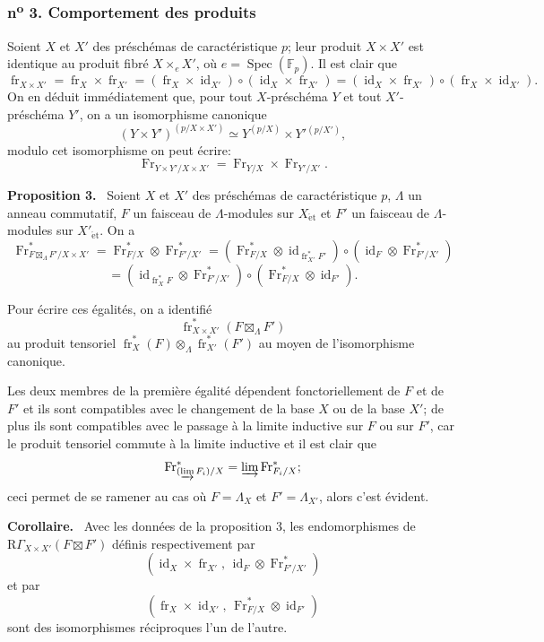 \documentclass[11pt]{article}
\newenvironment{statement}[1]{\par\medskip\noindent\textbf{#1.}\ }{\par\medskip}
\DeclareMathOperator{\Spec}{Spec}
\providecommand{\et}{\mathrm{\acute{e}t}}
\providecommand{\RGamma}{\mathrm R\Gamma}
\providecommand{\id}{\operatorname{id}}
\providecommand{\id}{\operatorname{id}}
\providecommand{\id}{\operatorname{id}}
\providecommand{\RGamma}{\mathrm R\Gamma}
\providecommand{\id}{\operatorname{id}}
\providecommand{\Spec}{\operatorname{Spec}}
\providecommand{\Spec}{\operatorname{Spec}}
\providecommand{\id}{\operatorname{id}}
\providecommand{\Spec}{\operatorname{Spec}}
\providecommand{\fr}{\operatorname{fr}}
\providecommand{\Fr}{\operatorname{Fr}}
\providecommand{\Fr}{\operatorname{Fr}}
\providecommand{\fr}{\operatorname{fr}}
\providecommand{\Spec}{\operatorname{Spec}}
\providecommand{\id}{\operatorname{id}}
\providecommand{\RGamma}{\mathrm R\Gamma}
\providecommand{\et}{\acute{e}t}
\providecommand{\boxt}{\boxtimes}
\begin{document}
\subsubsection*{n\textsuperscript{o} 3. Comportement des produits}

Soient $X$ et $X'$ des préschémas de caractéristique $p$; leur produit $X\times X'$ est identique au produit fibré $X\times_eX'$, où $e=\Spec(\mathbb F_p)$. Il est clair que
\[
\fr_{X\times X'}=\fr_X\times\fr_{X'}=(\fr_X\times\id_{X'})\circ(\id_X\times\fr_{X'})
=(\id_X\times\fr_{X'})\circ(\fr_X\times\id_{X'}).
\]
On en déduit immédiatement que, pour tout $X$-préschéma $Y$ et tout $X'$-préschéma $Y'$, on a un isomorphisme canonique
\[
(Y\times Y')^{(p/X\times X')}\simeq Y^{(p/X)}\times Y'{}^{(p/X')},
\]
modulo cet isomorphisme on peut écrire:
\[
\Fr_{Y\times Y'/X\times X'}=\Fr_{Y/X}\times\Fr_{Y'/X'}.
\]

\begin{statement}{Proposition 3}
Soient $X$ et $X'$ des préschémas de caractéristique $p$, $\Lambda$ un anneau commutatif, $F$ un faisceau de $\Lambda$-modules sur $X_{\et}$ et $F'$ un faisceau de $\Lambda$-modules sur $X'_{\et}$. On a
\[
\Fr^*_{F\boxt_\Lambda F'/X\times X'}
=\Fr^*_{F/X}\otimes\Fr^*_{F'/X'}
=(\Fr^*_{F/X}\otimes\id_{\fr_{X'}^*F'})\circ
(\id_F\otimes\Fr^*_{F'/X'})
\]
\[
=(\id_{\fr_X^*F}\otimes\Fr^*_{F'/X'})\circ
(\Fr^*_{F/X}\otimes\id_{F'}).
\]
\end{statement}

Pour écrire ces égalités, on a identifié
\[
\fr_{X\times X'}^*(F\boxt_\Lambda F')
\]
au produit tensoriel $\fr_X^*(F)\otimes_\Lambda\fr_{X'}^*(F')$ au moyen de l'isomorphisme canonique.

Les deux membres de la première égalité dépendent fonctoriellement de $F$ et de $F'$ et ils sont compatibles avec le changement de la base $X$ ou de la base $X'$; de plus ils sont compatibles avec le passage à la limite inductive sur $F$ ou sur $F'$, car le produit tensoriel commute à la limite inductive et il est clair que
\[
\Fr^*_{(\varinjlim F_i)/X}=\varinjlim\Fr^*_{F_i/X};
\]
ceci permet de se ramener au cas où $F=\Lambda_X$ et $F'=\Lambda_{X'}$, alors c'est évident.

\begin{statement}{Corollaire}
Avec les données de la proposition 3, les endomorphismes de $\RGamma_{X\times X'}(F\boxt F')$ définis respectivement par
\[
(\id_X\times\fr_{X'},\,\id_F\otimes\Fr^*_{F'/X'})
\]
et par
\[
(\fr_X\times\id_{X'},\,\Fr^*_{F/X}\otimes\id_{F'})
\]
sont des isomorphismes réciproques l'un de l'autre.
\end{statement}
\end{document}

